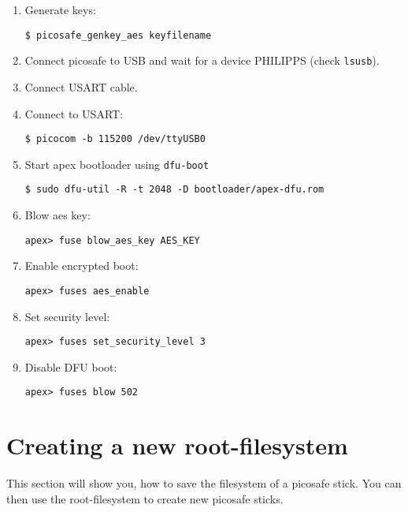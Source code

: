 \begin{enumerate}
\item Generate keys:

\texttt{\$ picosafe\_genkey\_aes keyfilename}

\item Connect picosafe to USB and wait for a device PHILIPPS (check \texttt{lsusb}).
\item Connect USART cable.
\item Connect to USART:

\texttt{\$ picocom -b 115200 /dev/ttyUSB0}
\item Start apex bootloader using \texttt{dfu-boot}

\texttt{\$ sudo dfu-util -R -t 2048 -D bootloader/apex-dfu.rom}

\item Blow aes key:

\texttt{apex> fuse blow\_aes\_key AES\_KEY}

\item Enable encrypted boot:

\texttt{apex> fuses aes\_enable}

\item Set security level:

\texttt{apex> fuses set\_security\_level 3}

\item Disable DFU boot:

\texttt{apex> fuses blow 502}
\end{enumerate}

\section{Creating a new root-filesystem}

This section will show you, how to save the filesystem of a picosafe stick. You
can then use the root-filesystem to create new picosafe sticks.

